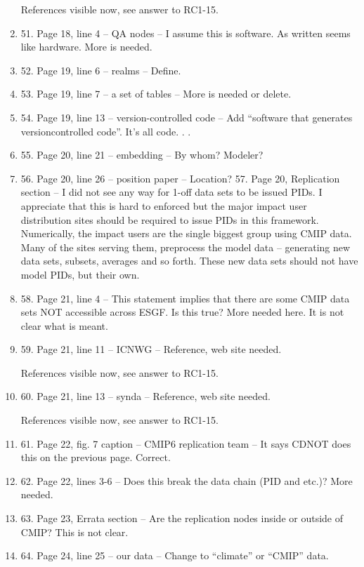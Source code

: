 \documentclass[gmd,manuscript]{copernicus}
\newenvironment{answer}{\color{blue}}{}
\begin{document}
\begin{enumerate}[label=RC1-\arabic*,leftmargin=*]
  \begin{answer}
    References visible now, see answer to RC1-15.
  \end{answer}
\item 51. Page 18, line 4 -- QA nodes -- I assume this is software. As
  written seems like hardware. More is needed.
\item 52. Page 19, line 6 -- realms -- Define.
\item 53. Page 19, line 7 -- a set of tables -- More is needed or
  delete.
\item 54. Page 19, line 13 -- version-controlled code -- Add “software
  that generates versioncontrolled code”. It’s all code. . .
\item 55. Page 20, line 21 -- embedding -- By whom? Modeler?
\item 56. Page 20, line 26 -- position paper -- Location? 57. Page 20,
  Replication section -- I did not see any way for 1-off data sets to
  be issued PIDs. I appreciate that this is hard to enforced but the
  major impact user distribution sites should be required to issue
  PIDs in this framework. Numerically, the impact users are the single
  biggest group using CMIP data. Many of the sites serving them,
  preprocess the model data -- generating new data sets, subsets,
  averages and so forth. These new data sets should not have model
  PIDs, but their own.
\item 58. Page 21, line 4 -- This statement implies that there are some
  CMIP data sets NOT accessible across ESGF. Is this true? More needed
  here. It is not clear what is meant.
\item 59. Page 21, line 11 -- ICNWG -- Reference, web site needed.

  \begin{answer}
    References visible now, see answer to RC1-15.
  \end{answer}
\item 60. Page 21, line 13 -- synda -- Reference, web site needed.

  \begin{answer}
    References visible now, see answer to RC1-15.
  \end{answer}
\item 61. Page 22, fig. 7 caption -- CMIP6 replication team -- It says
  CDNOT does this on the previous page. Correct.
\item 62. Page 22, lines 3-6 -- Does this break the data chain (PID and
  etc.)? More needed.
\item 63. Page 23, Errata section -- Are the replication nodes inside
  or outside of CMIP? This is not clear.
\item 64. Page 24, line 25 -- our data -- Change to “climate” or “CMIP”
  data.
\end{enumerate}
\end{document}
